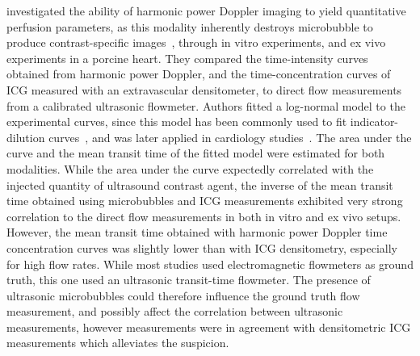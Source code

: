 \citet{Tiemann:2000wl} investigated the ability of harmonic power Doppler imaging to yield quantitative perfusion parameters, as this modality inherently destroys microbubble to produce contrast-specific images~\cite{Tiemann:1997vj}, through in vitro experiments, and ex vivo experiments in a porcine heart.
They compared the time-intensity curves obtained from harmonic power Doppler, and the time-concentration curves of ICG measured with an extravascular densitometer, to direct flow measurements from a calibrated ultrasonic flowmeter. 
Authors fitted a log-normal model to the experimental curves, since this model has been commonly used to fit indicator-dilution curves~\cite{Stow:1954ty,Wise:1966ji},
and was later applied in cardiology studies~\cite{Linton:1995ij,Band:1997ib}.
The area under the curve and the mean transit time of the fitted model were estimated for both modalities. 
While the area under the curve expectedly correlated with the injected quantity of ultrasound contrast agent, the inverse of the mean transit time obtained using microbubbles and ICG measurements exhibited very strong correlation to the direct flow measurements in both in vitro and ex vivo setups.
However, the mean transit time obtained with harmonic power Doppler time concentration curves was slightly lower than with ICG densitometry, especially for high flow rates.
While most studies used electromagnetic flowmeters as ground truth, this one used an ultrasonic transit-time flowmeter. 
The presence of ultrasonic microbubbles could therefore influence the ground truth flow measurement, and possibly affect the correlation between ultrasonic measurements, however measurements were in agreement with densitometric ICG measurements which alleviates the suspicion.

